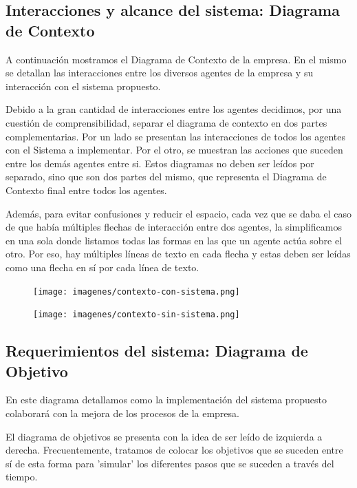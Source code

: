 \subsection{Interacciones y alcance del sistema: Diagrama de Contexto}
A continuación mostramos el Diagrama de Contexto de la empresa. En el mismo se detallan las interacciones entre los diversos agentes de la empresa y su interacción con el sistema propuesto.

Debido a la gran cantidad de interacciones entre los agentes decidimos, por una cuestión de comprensibilidad, separar el diagrama de contexto en dos partes complementarias. Por un lado se presentan las interacciones de todos los agentes con el Sistema a implementar. Por el otro, se muestran las acciones que suceden entre los demás agentes entre si. Estos diagramas no deben ser leídos por separado, sino que son dos partes del mismo, que representa el Diagrama de Contexto final entre todos los agentes.

Además, para evitar confusiones y reducir el espacio, cada vez que se daba el caso de que había múltiples flechas de interacción entre dos agentes, la simplificamos en una sola donde listamos todas las formas en las que un agente actúa sobre el otro. Por eso, hay múltiples líneas de texto en cada flecha y estas deben ser leídas como una flecha en sí por cada línea de texto.

\begin{figure}[H]
    \centering
    \texttt{[image: imagenes/contexto-con-sistema.png]}
\end{figure}

\begin{figure}[H]
    \centering
    \texttt{[image: imagenes/contexto-sin-sistema.png]}
\end{figure}

\newpage

\subsection{Requerimientos del sistema: Diagrama de Objetivo}
En este diagrama detallamos como la implementación del sistema propuesto colaborará con la mejora de los procesos de la empresa.

El diagrama de objetivos se presenta con la idea de ser leído de izquierda a derecha. Frecuentemente, tratamos de colocar los objetivos que se suceden entre sí de esta forma para 'simular' los diferentes pasos que se suceden a través del tiempo.

